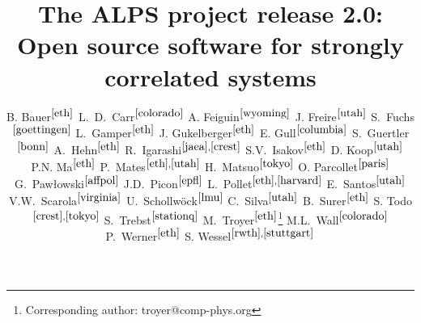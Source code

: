 \documentclass[12pt]{iopart}
\begin{document}
\title{The ALPS project release 2.0: \\ Open source software for strongly correlated systems}


\newcommand{\myauthor}[3]{#2$^{#1}$}
\newcommand{\myaddress}[2]{\address{\refstepcounter{affiliation} $^{\arabic{affiliation}}$#2 \label{#1}}}

\author{
	\myauthor{\ref{eth}}{B. Bauer}{bauerb@phys.ethz.ch}
	\myauthor{\ref{colorado}}{L.~D.~Carr}{lcarr@mines.edu}
	\myauthor{\ref{wyoming}}{A. Feiguin}{afeiguin@uwyo.edu}
	\myauthor{\ref{utah}}{J. Freire}{juliana@cs.utah.edu}
	\myauthor{\ref{goettingen}}{S.~Fuchs}{fuchs@theorie.physik.uni-goettingen.de}
	\myauthor{\ref{eth}}{L.~Gamper}{gamperl@gmail.com}
	\myauthor{\ref{eth}}{J. Gukelberger}{gukelberger@phys.ethz.ch}
	\myauthor{\ref{columbia}}{E. Gull}{gull@phys.columbia.edu}
	\myauthor{\ref{bonn}}{S.~Guertler}{guertler@th.physik.uni-bonn.de}
	\myauthor{\ref{eth}}{A.~Hehn}{hehn@phys.ethz.ch}
	\myauthor{\ref{jaea},\ref{crest}}{R.~Igarashi}{rigarash@hosi.phys.s.u-tokyo.ac.jp}
	\myauthor{\ref{eth}}{S.V.~Isakov}{isakov@phys.ethz.ch}
	\myauthor{\ref{utah}}{D. Koop}{dakoop@cs.utah.edu}
	\myauthor{\ref{eth}}{P.N. Ma}{pingnang@phys.ethz.ch}
	\myauthor{\ref{eth},\ref{utah}}{P.~Mates}{mates@sci.utah.edu}
	\myauthor{\ref{tokyo}}{H.~Matsuo}{halm@looper.t.u-tokyo.ac.jp}
	\myauthor{\ref{paris}}{O. Parcollet}{parcolle@spht.saclay.cea.fr}
	\myauthor{\ref{affpol}}{G.~Paw{\l}owski}{gpawlo@amu.edu.pl}
	\myauthor{\ref{epfl}}{J.D.~Picon}{jean-david.picon@epfl.chl}
	\myauthor{\ref{eth},\ref{harvard}}{L.~Pollet}{pollet@phys.ethz.ch}
	\myauthor{\ref{utah}}{E.~Santos}{emanuele@sci.utah.edu}
	\myauthor{\ref{virginia}}{V.W.~Scarola}{scarola@vt.edu}
	\myauthor{\ref{lmu}}{U.~Schollw\"ock}{schollwoeck@lmu.de}
	\myauthor{\ref{utah}}{C.~Silva}{csilva@sci.utah.edu}
	\myauthor{\ref{eth}}{B.~Surer}{surerb@phys.ethz.ch}
	\myauthor{\ref{crest},\ref{tokyo}}{S. Todo}{wistaria@ap.t.u-tokyo.ac.jp}
	\myauthor{\ref{stationq}}{S.~Trebst}{trebst@kitp.ucsb.edu}
	\myauthor{\ref{eth}}{M.~Troyer}{troyer@ethz.ch}\footnote{Corresponding author: troyer@comp-phys.org}
	\myauthor{\ref{colorado}}{M.L.~Wall}{mwall@mymail.mines.edu}
	\myauthor{\ref{eth}}{P.~Werner}{werner@phys.ethz.ch}
	\myauthor{\ref{rwth},\ref{stuttgart}}{S. Wessel}{wessel@phys.ethz.ch}
}

\end{document}
